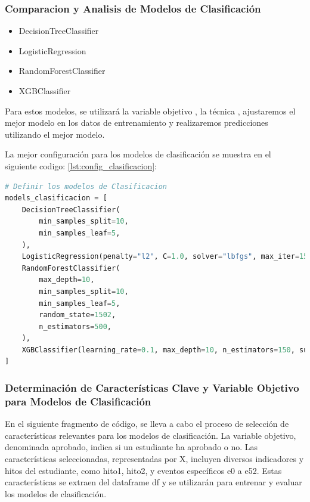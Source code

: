 \subsubsection{Comparacion y Analisis de Modelos de Clasificación}

\begin{itemize}
    \item DecisionTreeClassifier
    \item LogisticRegression
    \item RandomForestClassifier
    \item XGBClassifier
\end{itemize}

Para estos modelos, se utilizará la variable objetivo , la técnica , ajustaremos el mejor modelo en los datos de entrenamiento y realizaremos predicciones utilizando el mejor modelo.

La mejor configuración para los modelos de clasificación se muestra en el siguiente codigo: \ref{lst:config_clasificacion}:


\begin{lstlisting}[language=Python, caption=Definicion de los Modelos de Clasificación,label=lst:config_clasificacion]
# Definir los modelos de Clasificacion
models_clasificacion = [
    DecisionTreeClassifier(
        min_samples_split=10,
        min_samples_leaf=5,
    ),
    LogisticRegression(penalty="l2", C=1.0, solver="lbfgs", max_iter=150),
    RandomForestClassifier(
        max_depth=10,
        min_samples_split=10,
        min_samples_leaf=5,
        random_state=1502,
        n_estimators=500,
    ),
    XGBClassifier(learning_rate=0.1, max_depth=10, n_estimators=150, subsample=1.0),
]
\end{lstlisting}


\subsubsection{Determinación de Características Clave y Variable Objetivo para Modelos de Clasificación}

En el siguiente fragmento de código, se lleva a cabo el proceso de selección de características relevantes para los modelos de clasificación. La variable objetivo, denominada aprobado, indica si un estudiante ha aprobado o no. Las características seleccionadas, representadas por X, incluyen diversos indicadores y hitos del estudiante, como hito1, hito2, y eventos específicos e0 a e52. Estas características se extraen del dataframe df y se utilizarán para entrenar y evaluar los modelos de clasificación.

